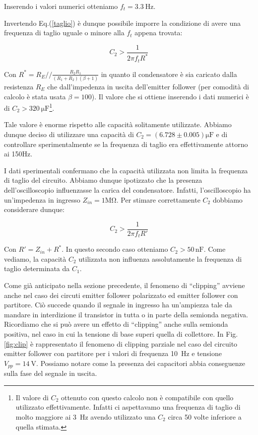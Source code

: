 Inserendo i valori numerici otteniamo $f_t=\SI{3.3}{\hertz}$.

Invertendo Eq.(\ref{taglio}) è dunque possibile imporre la condizione di avere una frequenza di taglio uguale o minore alla $f_t$ appena trovata: 

\begin{equation}
C_2>\frac{1}{2\pi f_t R^*}
\end{equation}

Con $R^*=R_E//\frac{R_2R_1}{(R_1+R_2)(\beta +1)}$ in quanto il condensatore è sia caricato dalla resistenza $R_E$ che dall'impedenza in uscita dell'emitter follower (per comodità di calcolo è stata usata $\beta=100$). Il valore che si ottiene inserendo i dati numerici è di $C_2>\SI{320}{\micro\farad}$\footnote{Il valore di $C_2$ ottenuto con questo calcolo non è compatibile con quello utilizzato effettivamente. Infatti ci aspettavamo una frequenza di taglio di molto maggiore ai \SI{3}{\hertz} avendo utilizzato una $C_2$ circa 50 volte inferiore a quella stimata.}.

Tale valore è enorme rispetto alle capacità solitamente utilizzate. Abbiamo dunque deciso di utilizzare una capacità di $C_2=(6.728 \pm 0.005)\si{\micro\farad}$ e di controllare sperimentalmente se la frequenza di taglio era effettivamente attorno ai 150\si{\hertz}.

I dati sperimentali confermano che la capacità utilizzata non limita la frequenza di taglio del circuito. Abbiamo dunque ipotizzato che la presenza dell'oscilloscopio influenzasse la carica del condensatore. Infatti, l'oscilloscopio ha un'impedenza in ingresso $Z_{in}=1\si{\mega\ohm}$. Per stimare correttamente $C_2$ dobbiamo considerare dunque: 

$$C_2>\frac{1}{2\pi f_t R'}$$

Con $R'=Z_{in}+R^*$. In questo secondo caso otteniamo $C_2>50\,\si{\nano\farad}$.
Come vediamo, la capacità $C_2$ utilizzata non influenza assolutamente la frequenza di taglio determinata da $C_1$. 


Come già anticipato nella sezione precedente, il fenomeno di ``clipping'' avviene anche nel caso dei circuti emitter follower polarizzato ed emitter follower con partitore.
Ciò succede quando il segnale in ingresso ha un'ampiezza tale da mandare in interdizione il transistor in tutta o in parte  della semionda negativa. Ricordiamo che si può avere un effetto di ``clipping'' anche sulla semionda positiva, nel caso in cui la tensione di base superi quella di collettore. 
In Fig. \ref{fig:clip} è rappresentato il fenomeno di clipping parziale nel caso del circuito emitter follower con partitore per i valori di frequenza \SI{10}{\hertz} e tensione $V_{pp} = \SI{14}{\volt}$. Possiamo notare come la presenza dei capacitori abbia conseguenze sulla fase del segnale in uscita.


